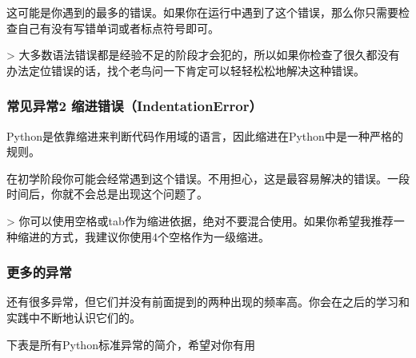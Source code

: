 \documentclass[11pt]{article}
\begin{document}
这可能是你遇到的最多的错误。如果你在运行中遇到了这个错误，那么你只需要检查自己有没有写错单词或者标点符号即可。

\textgreater{}
大多数语法错误都是经验不足的阶段才会犯的，所以如果你检查了很久都没有办法定位错误的话，找个老鸟问一下肯定可以轻轻松松地解决这种错误。

    \subsubsection{常见异常2
缩进错误（IndentationError）}\label{ux5e38ux89c1ux5f02ux5e382-ux7f29ux8fdbux9519ux8befindentationerror}

Python是依靠缩进来判断代码作用域的语言，因此缩进在Python中是一种严格的规则。

在初学阶段你可能会经常遇到这个错误。不用担心，这是最容易解决的错误。一段时间后，你就不会总是出现这个问题了。

\textgreater{}
你可以使用空格或tab作为缩进依据，绝对不要混合使用。如果你希望我推荐一种缩进的方式，我建议你使用4个空格作为一级缩进。

    \subsubsection{更多的异常}\label{ux66f4ux591aux7684ux5f02ux5e38}

还有很多异常，但它们并没有前面提到的两种出现的频率高。你会在之后的学习和实践中不断地认识它们的。

下表是所有Python标准异常的简介，希望对你有用
\end{document}
